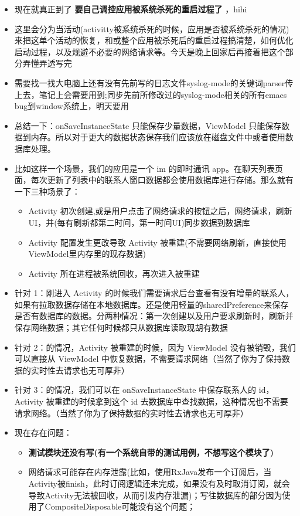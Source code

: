 \documentclass[9pt, b5paper]{article}
\begin{document}
\begin{itemize}
\item 现在就真正到了 \textbf{要自己调控应用被系统杀死的重启过程了} ，hihi
\item 这里会分为当活动(activitty被系统杀死的时候，应用是否被系统杀死的情况)来把这单个活动的恢复，和或整个应用被杀死后的重启过程搞清楚，如何优化启动过程，以及规避不必要的网络请求等。今天是晚上回家后再接着把这个部分弄懂弄透写完
\item 需要找一找大电脑上还有没有先前写的日志文件syslog-mode的关键词parser传上去，笔记上会需要用到;同步先前所修改过的syslog-mode相关的所有emacs bug到window系统上，明天要用
\item 总结一下：onSaveInstanceState 只能保存少量数据，ViewModel 只能保存数据到内存。所以对于更大的数据状态保存我们应该放在磁盘文件中或者使用数据库处理。
\item 比如这样一个场景，我们的应用是一个 im 的即时通讯 app。在聊天列表页面，每次更新了列表中的联系人窗口数据都会使用数据库进行存储。那么就有一下三种场景了：
\begin{itemize}
\item Activity 初次创建,或是用户点击了网络请求的按钮之后，网络请求，刷新UI，并(每有刷新都第二时间，第一时间UI)同步数据到数据库
\item Activity 配置发生更改导致 Activity 被重建(不需要网络刷新，直接使用ViewModel里内存里的现存数据)
\item Activity 所在进程被系统回收，再次进入被重建
\end{itemize}
\item 针对 1：刚进入 Activity 的时候我们需要请求后台查看有没有增量的联系人，如果有拉取数据存储在本地数据库。还是使用轻量的sharedPreference来保存是否有数据库的数据。分两种情况：第一次创建以及用户要求刷新时，刷新并保存网络数据；其它任何时候都只从数据库读取现胡有数据
\item 针对 2：的情况，Activity 被重建的时候，因为 ViewModel 没有被销毁，我们可以直接从 ViewModel 中恢复数据，不需要请求网络（当然了你为了保持数据的实时性去请求也无可厚非）
\item 针对 3：的情况，我们可以在 onSaveInstanceState 中保存联系人的 id，Activity 被重建的时候拿到这个 id 去数据库中查找数据，这种情况也不需要请求网络。（当然了你为了保持数据的实时性去请求也无可厚非）
\item 现在存在问题：
\begin{itemize}
\item \textbf{测试模块还没有写(有一个系统自带的测试用例，不想写这个模块了)}
\item 网络请求可能存在内存泄露(比如，使用RxJava发布一个订阅后，当Activity被finish，此时订阅逻辑还未完成，如果没有及时取消订阅，就会导致Activity无法被回收，从而引发内存泄漏)；写往数据库的部分因为使用了CompositeDisposable可能没有这个问题；

\end{itemize}
\end{itemize}
\end{document}
